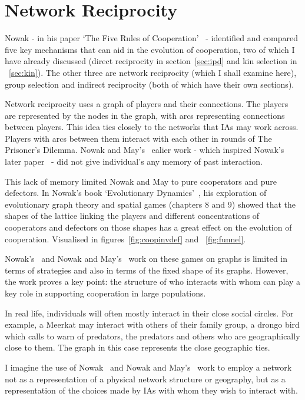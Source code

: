 \documentclass[]{final_report}
\begin{document}
\section{Network Reciprocity}
Nowak - in his paper `The Five Rules of Cooperation'~\cite{five_rules_coop} - identified and compared five key mechanisms that can aid in the evolution of cooperation, two of which I have already discussed (direct reciprocity in section~\ref{sec:ipd} and kin selection in ~\ref{sec:kin}). The other three are network reciprocity (which I shall examine here), group selection and indirect reciprocity (both of which have their own sections).\par
Network reciprocity uses a graph of players and their connections. The players are represented by the nodes in the graph, with arcs representing connections between players. This idea ties closely to the networks that IAs may work across. Players with arcs between them interact with each other in rounds of The Prisoner's Dilemma. Nowak and May's~\cite{spatial} ealier work - which inspired Nowak's later paper~\cite{five_rules_coop} - did not give individual's any memory of past interaction.\par
This lack of memory limited Nowak and May to pure cooperators and pure defectors. In Nowak's book `Evolutionary Dynamics'~\cite{nowak2006evolutionary}, his exploration of evolutionary graph theory and spatial games (chapters 8 and 9) showed that the shapes of the lattice linking the players and different concentrations of cooperators and defectors on those shapes has a great effect on the evolution of cooperation. Visualised in figures~\ref{fig:coopinvdef} and ~\ref{fig:funnel}.\par
Nowak's~\cite{five_rules_coop, nowak2006evolutionary} and Nowak and May's~\cite{spatial} work on these games on graphs is limited in terms of strategies and also in terms of the fixed shape of its graphs. However, the work proves a key point: the structure of who interacts with whom can play a key role in supporting cooperation in large populations.\par
In real life, individuals will often mostly interact in their close social circles. For example, a Meerkat may interact with others of their family group, a drongo bird which calls to warn of predators, the predators and others who are geographically close to them. The graph in this case represents the close geographic ties.\par
I imagine the use of Nowak~\cite{five_rules_coop, nowak2006evolutionary} and Nowak and May's~\cite{spatial} work to employ a network not as a representation of a physical network structure or geography, but as a representation of the choices made by IAs with whom they wish to interact with.\par
\end{document}
